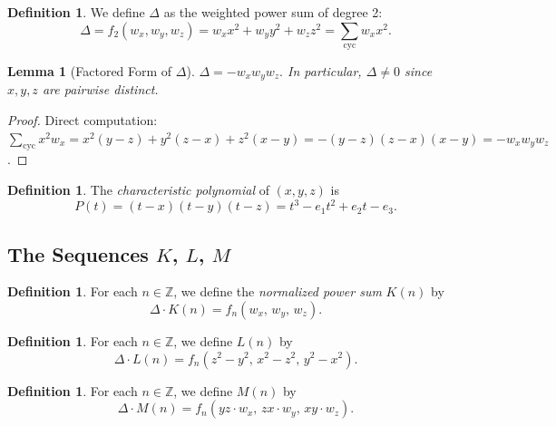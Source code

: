 \documentclass[12pt]{article}
\newtheorem{lemma}[theorem]{Lemma}
\theoremstyle{definition}
\newtheorem{definition}[theorem]{Definition}
\newcommand{\cycsum}[1]{\sum_{\mathrm{cyc}}#1}
\newcommand{\wx}{w_x}
\newcommand{\wy}{w_y}
\newcommand{\wz}{w_z}
\begin{document}
	\begin{definition}
		We define $\Delta$ as the weighted power sum of degree 2:
		\[ \Delta = f_2(\wx, \wy, \wz) = \wx x^2 + \wy y^2 + \wz z^2 = \cycsum{\wx x^2}. \]
	\end{definition}
	
	\begin{lemma}[Factored Form of $\Delta$]
		\label{lem:delta_factored}
		$\Delta = -\wx\wy\wz.$
		In particular, $\Delta \neq 0$ since $x, y, z$ are pairwise distinct.
	\end{lemma}
	\begin{proof}
		Direct computation: $\cycsum{x^2 w_x} = x^2(y-z)+y^2(z-x)+z^2(x-y) = -(y-z)(z-x)(x-y) = -\wx\wy\wz$.
	\end{proof}
	
	\begin{definition}
		\label{def:char_poly}
		The \emph{characteristic polynomial} of $(x, y, z)$ is
		\[ P(t) = (t-x)(t-y)(t-z) = t^3 - e_1 t^2 + e_2 t - e_3. \]
	\end{definition}
	
	\subsection{The Sequences $K$, $L$, $M$}
	
	\begin{definition}
		\label{def:K}
		For each $n \in \mathbb{Z}$, we define the \emph{normalized power sum} $K(n)$ by
		\[ \Delta \cdot K(n) = f_n(\wx,\, \wy,\, \wz). \]
	\end{definition}
	
	\begin{definition}
		\label{def:L}
		For each $n \in \mathbb{Z}$, we define $L(n)$ by
		\[ \Delta \cdot L(n) = f_n(z^2 - y^2,\, x^2 - z^2,\, y^2 - x^2). \]
	\end{definition}
	
	\begin{definition}
		\label{def:M}
		For each $n \in \mathbb{Z}$, we define $M(n)$ by
		\[ \Delta \cdot M(n) = f_n(yz\cdot w_x,\, zx\cdot w_y,\, xy\cdot w_z). \]
	\end{definition}
	
\end{document}
